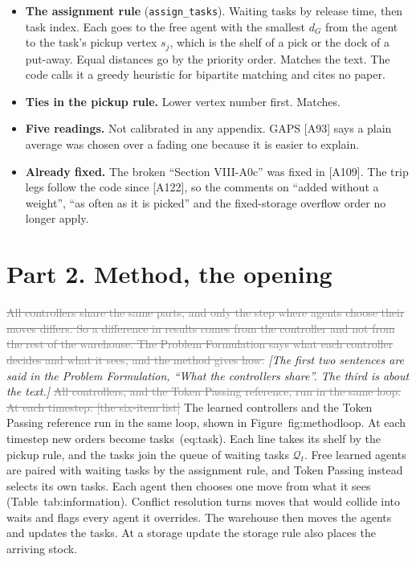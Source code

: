 \documentclass[11pt,a4paper]{article}
\newcommand{\new}[1]{\textcolor{newc}{#1}}
\newcommand{\old}[1]{\textcolor{gray}{\sout{#1}}}
\newcommand{\note}[1]{{\small\itshape [#1]}}
\newcommand{\lab}[1]{\textsf{\footnotesize #1}}
\renewcommand{\ref}[1]{\lab{#1}}
\renewcommand{\eqref}[1]{(\lab{#1})}
\begin{document}
\begin{itemize}[nosep]
    never reaches a placement. A pallet comes only after $Q$ units of the
    SKU were ordered, so its category is known by then, and it stays,
    since every line of a SKU goes to its own category.
  \item \textbf{The assignment rule} (\texttt{assign\_tasks}). Waiting tasks
    by release time, then task index. Each goes to the free agent with the
    smallest $d_G$ from the agent to the task's pickup vertex $s_j$, which
    is the shelf of a pick or the dock of a put-away. Equal distances go by
    the priority order. Matches the text. The code calls it a greedy
    heuristic for bipartite matching and cites no paper.
  \item \textbf{Ties in the pickup rule.} Lower vertex number first. Matches.
  \item \textbf{Five readings.} Not calibrated in any appendix. GAPS [A93]
    says a plain average was chosen over a fading one because it is easier
    to explain.
  \item \textbf{Already fixed.} The broken ``Section VIII-A0c'' was fixed in
    [A109]. The trip legs follow the code since [A122], so the comments on
    ``added without a weight'', ``as often as it is picked'' and the
    fixed-storage overflow order no longer apply.
\end{itemize}

\section*{Part 2. Method, the opening}
\old{All controllers share the same parts, and only the step where agents
choose their moves differs. So a difference in results comes from the
controller and not from the rest of the warehouse. The Problem Formulation
says what each controller decides and what it sees, and the method gives
how.} \note{The first two sentences are said in the Problem Formulation,
``What the controllers share''. The third is about the text.}
\old{All controllers, and the Token Passing reference, run in the same loop.
At each timestep: [the six-item list]}
\new{The learned controllers and the Token Passing reference run in the same
loop, shown in Figure~\ref{fig:methodloop}. At each timestep new orders
become tasks~\eqref{eq:task}. Each line takes its shelf by the pickup rule,
and the tasks join the queue of waiting tasks $\mathcal{Q}_t$. Free learned
agents are paired with waiting tasks by the assignment rule, and Token
Passing instead selects its own tasks. Each agent then chooses one move from
what it sees (Table~\ref{tab:information}). Conflict resolution turns moves
that would collide into waits and flags every agent it overrides. The
warehouse then moves the agents and updates the tasks. At a storage update
the storage rule also places the arriving stock.}
\end{document}
